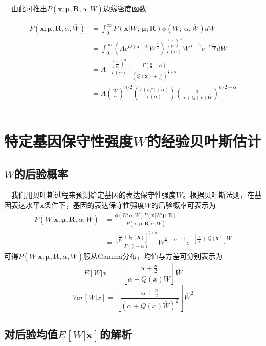 \documentclass[hyperref,]{ctexart}
\begin{document}
 由此可推出\(P\left(\boldsymbol{x};\boldsymbol{\mu},\boldsymbol{R},\alpha,\overline{W}\right)\)边缘密度函数

\begin{align*} 
P\left(\boldsymbol{x};\boldsymbol{\mu},\boldsymbol{R},\alpha,\overline{W}\right)&=\int_0^{\infty}P\left(\boldsymbol{x}|W;\ \boldsymbol{\mu};\boldsymbol{R}\right)\phi\left(W;\ \alpha,\overline{W}\right)dW\\
&=\int_0^{\infty}\left(Ae^{Q\left(\boldsymbol{x}\right)W}W^{\frac{n}{2}}\right)\frac{\left(\frac{\alpha}{\overline{W}}\right)^{\alpha}}{\Gamma\left(\alpha\right)}W^{\alpha-1}e^{-\alpha\frac{\omega}{\overline{W}}}dW\\
&=A\cdot\frac{\left(\frac{\alpha}{\overline{W}}\right)^{\alpha}}{\Gamma\left(\alpha\right)}\cdot\frac{\Gamma\left(\frac{n}{2}+\alpha\right)}{\left(Q\left(\boldsymbol{x}\right)+\frac{\alpha}{\overline{W}}\right)^{\frac{n}{2}+\alpha}}\\
&=A\left(\frac{\overline{W}}{\alpha}\right)^{n/2}\left(\frac{\Gamma\left(n/2+\alpha\right)}{\Gamma\left(\alpha\right)}\right)\left(\frac{\alpha}{\alpha+Q\left(\boldsymbol{x}\right)\overline{W}}\right)^{n/2+\alpha}\end{align*}

\begin{center}\rule{0.5\linewidth}{\linethickness}\end{center}

\hypertarget{w}{%
\section{\texorpdfstring{特定基因保守性强度\(W\)的经验贝叶斯估计}{特定基因保守性强度W的经验贝叶斯估计}}\label{w}}

\hypertarget{w}{%
\subsection{\texorpdfstring{\(W\)的后验概率}{W的后验概率}}\label{w}}

 我们用贝叶斯过程来预测给定基因的表达保守性强度\(W\)。根据贝叶斯法则，在基因表达水平\(\boldsymbol{x}\)条件下，基因的表达保守性强度\(W\)的后验概率可表示为
\begin{align*}P\left(W|\boldsymbol{x};\boldsymbol{\mu},\boldsymbol{R},\alpha,\overline{W}\right)&=\frac{\phi\left(W;\alpha,\overline{W}\right)P\left(\boldsymbol{x}|W;\boldsymbol{\mu},\boldsymbol{R}\right)}{P\left(\boldsymbol{x};\boldsymbol{\mu},\boldsymbol{R},\alpha,\overline{W}\right)}\\
&=\frac{\left[\frac{\alpha}{\overline{W}}+Q\left(\boldsymbol{x}\right)\right]^{\frac{n}{2}+\alpha}}{\Gamma\left(\frac{n}{2}+\alpha\right)}W^{\frac{n}{2}+\alpha-1}e^{-\left[\frac{\alpha}{\overline{W}}+Q\left(\boldsymbol{x}\right)\right]W}\end{align*}
可得\(P\left(W|\boldsymbol{x};\boldsymbol{\mu},\boldsymbol{R},\alpha,\overline{W}\right)\)服从Gamma分布，均值与方差可分别表示为
\[E\left[W|x\right]\  =\left[\frac{\alpha+\frac{n}{2}}{\alpha+Q\left(x\right)\overline{W}}\right]\overline{W}\]
\[Var\left[W|x\right]=\left[\frac{\alpha+\frac{n}{2}}{\left(\alpha+Q\left(x\right)\overline{W}\right)^2}\right]\overline{W}^2\]

\hypertarget{ewboldsymbolx}{%
\subsection{\texorpdfstring{对后验均值\(E[W|\boldsymbol{x}]\)的解析}{对后验均值E{[}W\textbar{}\textbackslash{}boldsymbol\{x\}{]}的解析}}\label{ewboldsymbolx}}
\end{document}
